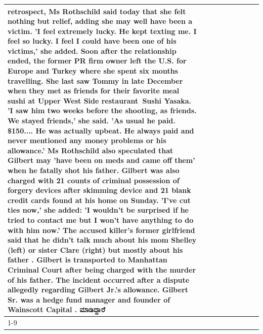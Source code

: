 \begin{table}[H]
\begin{tabular}{lllrlllll}
retrospect, Ms Rothschild said today that she felt nothing but relief, adding she may well have been a victim. 'I feel extremely lucky. He kept texting me. I feel so lucky. I feel I could have been one of his victims,' she added. Soon after the relationship ended, the former PR firm owner left the U.S. for Europe and Turkey where she spent six months  travelling. She last saw Tommy in late December when they met as friends for their favorite meal sushi at Upper West Side restaurant Sushi Yasaka. 'I saw him two weeks before the shooting, as friends. We stayed friends,' she said. 'As usual he paid. \$150.... He was actually upbeat. He always paid and never mentioned any money problems or his allowance.' Ms Rothschild also speculated that Gilbert may 'have been on meds and came off them' when he fatally shot his father. Gilbert was also charged with 21 counts of criminal possession of forgery devices after skimming device and 21 blank credit cards found at his home on Sunday. 'I've cut ties now,' she added: 'I wouldn’t be surprised if he tried to contact me but I won’t have anything to do with him now.' The accused killer's former girlfriend said that he didn't talk much about his mom Shelley (left) or sister Clare (right) but mostly about his father . Gilbert is transported to Manhattan Criminal Court  after being charged with the murder of his father. The incident occurred after a dispute allegedly regarding Gilbert Jr.'s allowance. Gilbert Sr. was a hedge fund manager and founder of Wainscott Capital . ಮಾಡಿದ್ದಾರೆ \\
\cline{1-9}

\end{tabular}
\end{table}
